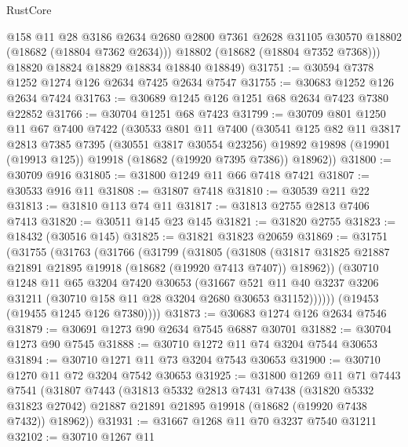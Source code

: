 \begin{lexlean}{RustCore}
\begin{coremodule}
          @158
          @11
          @28
          @3186
          @2634
          @2680
          @2800
          @7361
          @2628
          @31105
          @30570
          @18802
          (@18682 (@18804 @7362 @2634)))
        @18802
        (@18682 (@18804 @7352 @7368)))
      @18820
      @18824
      @18829
      @18834
      @18840
      @18849)
@31751 := @30594 @7378 @1252 @1274 @126 @2634 @7425 @2634 @7547
@31755 := @30683 @1252 @126 @2634 @7424
@31763 := @30689 @1245 @126 @1251 @68 @2634 @7423 @7380 @22852
@31766 := @30704 @1251 @68 @7423
@31799 := @30709
    @801
    @1250
    @11
    @67
    @7400
    @7422
    (@30533
      @801
      @11
      @7400
      (@30541
        @125
        @82
        @11
        @3817
        @2813
        @7385
        @7395
        (@30551 @3817 @30554 @23256)
        @19892
        @19898
        (@19901 (@19913 @125))
        @19918
        (@18682 (@19920 @7395 @7386))
        @18962))
@31800 := @30709 @916
@31805 := @31800 @1249 @11 @66 @7418 @7421
@31807 := @30533 @916 @11
@31808 := @31807 @7418
@31810 := @30539 @211 @22
@31813 := @31810 @113 @74 @11
@31817 := @31813 @2755 @2813 @7406 @7413
@31820 := @30511 @145 @23 @145
@31821 := @31820 @2755
@31823 := @18432 (@30516 @145)
@31825 := @31821 @31823 @20659
@31869 := @31751
    (@31755
      (@31763
        (@31766
          (@31799
            (@31805
              (@31808
                (@31817 @31825 @21887 @21891 @21895 @19918 (@18682 (@19920 @7413 @7407)) @18962))
              (@30710
                @1248
                @11
                @65
                @3204
                @7420
                @30653
                (@31667
                  @521
                  @11
                  @40
                  @3237
                  @3206
                  @31211
                  (@30710 @158 @11 @28 @3204 @2680 @30653 @31152))))))
        (@19453 (@19455 @1245 @126 @7380))))
@31873 := @30683 @1274 @126 @2634 @7546
@31879 := @30691 @1273 @90 @2634 @7545 @6887 @30701
@31882 := @30704 @1273 @90 @7545
@31888 := @30710 @1272 @11 @74 @3204 @7544 @30653
@31894 := @30710 @1271 @11 @73 @3204 @7543 @30653
@31900 := @30710 @1270 @11 @72 @3204 @7542 @30653
@31925 := @31800
    @1269
    @11
    @71
    @7443
    @7541
    (@31807
      @7443
      (@31813
        @5332
        @2813
        @7431
        @7438
        (@31820 @5332 @31823 @27042)
        @21887
        @21891
        @21895
        @19918
        (@18682 (@19920 @7438 @7432))
        @18962))
@31931 := @31667 @1268 @11 @70 @3237 @7540 @31211
@32102 := @30710
    @1267
    @11

\end{coremodule}
\end{lexlean}
